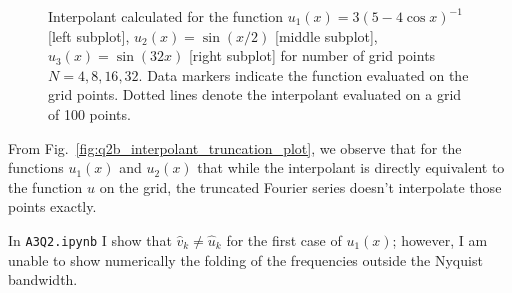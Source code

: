 \documentclass[12pt]{article}
\newcommand{\vhat}{\hat{v}}
\begin{document}
\begin{figure}[!h]
    \caption{
        Interpolant calculated for the function $u_{1}(x) = 3\left(5-4\cos x\right)^{-1}$ [left subplot], $u_{2}(x) = \sin(x/2)$ [middle subplot],  $u_{3}(x) = \sin(32x)$ [right subplot] for number of grid points $N = 4, 8, 16, 32$. Data markers indicate the function evaluated on the grid points. Dotted lines denote the interpolant evaluated on a grid of 100 points.
    }
    \label{fig:q2b_interpolant_plot}
\end{figure}

From Fig.~\ref{fig:q2b_interpolant_truncation_plot}, we observe that for the functions $u_{1}(x)$ and $u_{2}(x)$ that while the interpolant is directly equivalent to the function $u$ on the grid, the truncated Fourier series doesn't interpolate those points exactly.  

In \verb|A3Q2.ipynb| I show that $\vhat_{k} \neq \hat{u}_{k}$ for the first case of $u_{1}(x)$; however, I am unable to show numerically the folding of the frequencies outside the Nyquist bandwidth.
\end{document}
